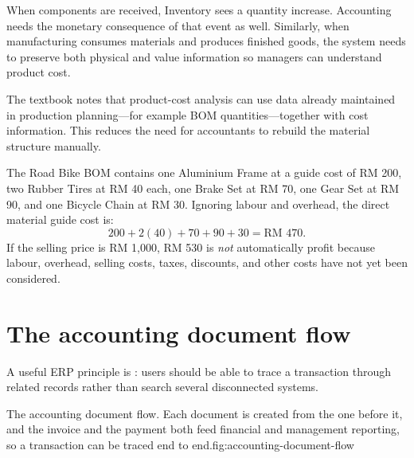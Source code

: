 When components are received, Inventory sees a quantity increase. Accounting needs the monetary consequence of that event as well. Similarly, when manufacturing consumes materials and produces finished goods, the system needs to preserve both physical and value information so managers can understand product cost.

The textbook notes that product-cost analysis can use data already maintained in production planning---for example BOM quantities---together with cost information. This reduces the need for accountants to rebuild the material structure manually.

\begin{workedexample}
The Road Bike BOM contains one Aluminium Frame at a guide cost of RM 200, two Rubber Tires at RM 40 each, one Brake Set at RM 70, one Gear Set at RM 90, and one Bicycle Chain at RM 30. Ignoring labour and overhead, the direct material guide cost is:
\[
200 + 2(40)+70+90+30=\text{RM }470.
\]
If the selling price is RM 1,000, RM 530 is \emph{not} automatically profit because labour, overhead, selling costs, taxes, discounts, and other costs have not yet been considered.
\end{workedexample}

\section{The accounting document flow}

A useful ERP principle is : users should be able to trace a transaction through related records rather than search several disconnected systems.

\begin{utpfig}{The accounting document flow. Each document is created from the one before it, and the invoice and the payment both feed financial and management reporting, so a transaction can be traced end to end.}{fig:accounting-document-flow}
\end{utpfig}

